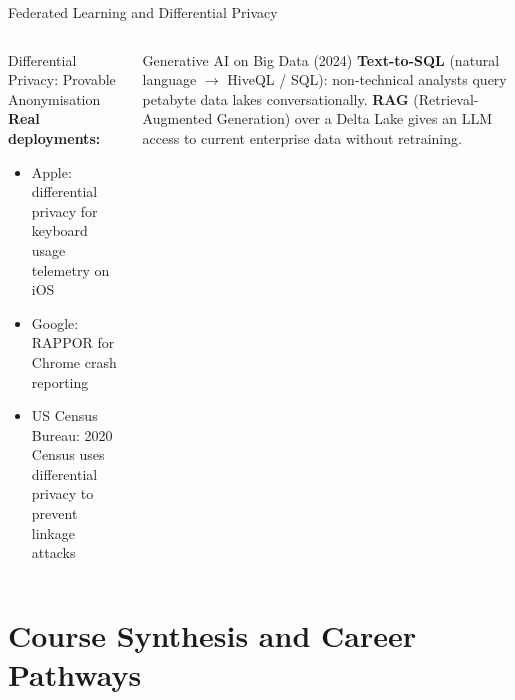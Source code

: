 \documentclass[aspectratio=169,10pt]{beamer}
\begin{document}
\begin{frame}{Federated Learning and Differential Privacy}
\begin{columns}[T]
\begin{exampleblock}{Differential Privacy: Provable Anonymisation}
        \vspace{4pt}
        \textbf{Real deployments:}
        \begin{itemize}
          \item Apple: differential privacy for keyboard usage telemetry on iOS
          \item Google: RAPPOR for Chrome crash reporting
          \item US Census Bureau: 2020 Census uses differential privacy to prevent linkage attacks
        \end{itemize}
      \end{exampleblock}
      \begin{alertblock}{\small Generative AI on Big Data (2024)}
        \small \textbf{Text-to-SQL} (natural language $\to$ HiveQL / SQL): non-technical analysts query petabyte data lakes conversationally.  \textbf{RAG} (Retrieval-Augmented Generation) over a Delta Lake gives an LLM access to current enterprise data without retraining.
      \end{alertblock}
  \end{columns}
\end{frame}

\section{Course Synthesis and Career Pathways}
\end{document}
